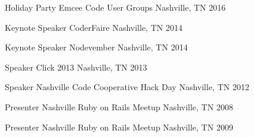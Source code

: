 
\begin{cvpublicspeakings}
  \cvpublicspeaking
  {Holiday Party Emcee}
  {Code User Groups}
  {Nashville, TN}
  {2016}

  \cvpublicspeaking
  {Keynote Speaker}
  {CoderFaire}
  {Nashville, TN}
  {2014}

  \cvpublicspeaking
  {Keynote Speaker}
  {Nodevember}
  {Nashville, TN}
  {2014}

  \cvpublicspeaking
  {Speaker}
  {Click 2013}
  {Nashville, TN}
  {2013}

  \cvpublicspeaking
  {Speaker}
  {Nashville Code Cooperative Hack Day}
  {Nashville, TN}
  {2012}

  \cvpublicspeaking
  {Presenter}
  {Nashville Ruby on Rails Meetup}
  {Nashville, TN}
  {2008}

  \cvpublicspeaking
  {Presenter}
  {Nashville Ruby on Rails Meetup}
  {Nashville, TN}
  {2009}

\end{cvpublicspeakings}
